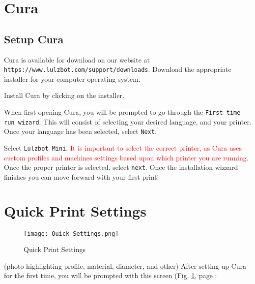 %
%
%
%
%

\section{Cura}

\subsection{Setup Cura}

Cura is available for download on our website at \texttt{https://www.lulzbot.com/support/downloads}. Download the appropriate installer for your computer operating system.

Install Cura by clicking on the installer.

When first opening Cura, you will be prompted to go through the \texttt{First time run wizard}. This will consist of selecting your desired language, and your printer. Once your language has been selected, select \texttt{Next}.

Select \texttt{Lulzbot Mini}. \textcolor{red}{It is important to select the correct printer, as Cura uses custom profiles and machines settings based upon which printer you are running.} 
Once the proper printer is selected, select \texttt{next}. Once the installation wizzard finishes you can move forward with your first print!


\section{Quick Print Settings}
\begin{figure}[hbt]
\centering
\texttt{[image: Quick\_Settings.png]}
\caption{Quick Print Settings}
\label{fig:Cura}
\end{figure} (photo highlighting profile, material, diameter, and other)
After setting up Cura for the first time, you will be prompted with this screen (Fig. \ref{fig:Cura}, page \pageref{fig:Cura}: 

